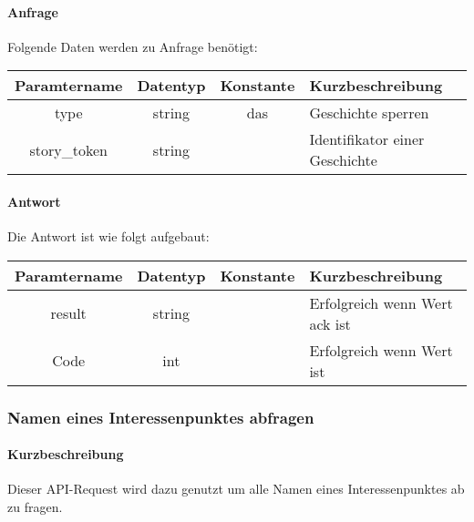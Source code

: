 \paragraph{Anfrage}Folgende Daten werden zu Anfrage benötigt:
\begin{table}[H]
	\begin{tabular}{|c|c|c|p{6.5cm}|}
		\hline
		\textbf{Paramtername} & \textbf{Datentyp} & \textbf{Konstante} & \textbf{Kurzbeschreibung}                                                                                               \\ \hline
		type                & string            & das                & Geschichte sperren \\ \hline
		story\_token        & string            &                    & Identifikator einer Geschichte \\ \hline
	\end{tabular}
\end{table}
\paragraph{Antwort}Die Antwort ist wie folgt aufgebaut:
\begin{table}[H]
	\begin{tabular}{|c|c|c|p{6.5cm}|}
		\hline
		\textbf{Paramtername} & \textbf{Datentyp} & \textbf{Konstante} & \textbf{Kurzbeschreibung}                                                                                               \\ \hline
		result              & string           &                 & Erfolgreich wenn Wert {\glqq ack\grqq} ist \\ \hline
		Code                & int              &                 & Erfolgreich wenn Wert {\glqq 0\grqq} ist \\ \hline
	\end{tabular}
\end{table}

\subsubsection{Namen eines Interessenpunktes abfragen}
\paragraph{Kurzbeschreibung}Dieser API-Request wird dazu genutzt um alle Namen eines Interessenpunktes ab zu fragen.
